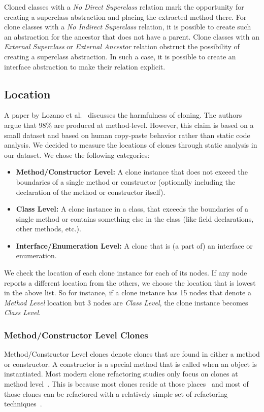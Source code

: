 \documentclass[runningheads]{llncs}
\begin{document}
Cloned classes with a \textit{No Direct Superclass} relation mark the opportunity for creating a superclass abstraction and placing the extracted method there. For clone classes with a \textit{No Indirect Superclass} relation, it is possible to create such an abstraction for the ancestor that does not have a parent. Clone classes with an \textit{External Superclass} or \textit{External Ancestor} relation obstruct the possibility of creating a superclass abstraction. In such a case, it is possible to create an interface abstraction to make their relation explicit.


\subsection{Location}\label{sec:setuplocation}
A paper by Lozano et al.~\cite{lozano2007evaluating} discusses the harmfulness of cloning. The authors argue that 98\% are produced at method-level. However, this claim is based on a small dataset and based on human copy-paste behavior rather than static code analysis. We decided to measure the locations of clones through static analysis in our dataset. We chose the following categories:
\begin{itemize}
  \item \textbf{Method/Constructor Level:} A clone instance that does not exceed the boundaries of a single method or constructor (optionally including the declaration of the method or constructor itself).
  \item \textbf{Class Level:} A clone instance in a class, that exceeds the boundaries of a single method or contains something else in the class (like field declarations, other methods, etc.).
  \item \textbf{Interface/Enumeration Level:} A clone that is (a part of) an interface or enumeration.
\end{itemize}
We check the location of each clone instance for each of its nodes. If any node reports a different location from the others, we choose the location that is lowest in the above list. So for instance, if a clone instance has 15 nodes that denote a \textit{Method Level} location but 3 nodes are \textit{Class Level}, the clone instance becomes \textit{Class Level}.

\subsubsection{Method/Constructor Level Clones} \label{sec:methodlevelcr}
Method/Constructor Level clones denote clones that are found in either a method or constructor. A constructor is a special method that is called when an object is instantiated. Most modern clone refactoring studies only focus on clones at method level~\cite{yue2018automatic, yongting2018detection}. This is because most clones reside at those places~\cite{lozano2007evaluating, fontana2015duplicated} and most of those clones can be refactored with a relatively simple set of refactoring techniques~\cite{kodhai2013method, fontana2015duplicated}.
\end{document}
